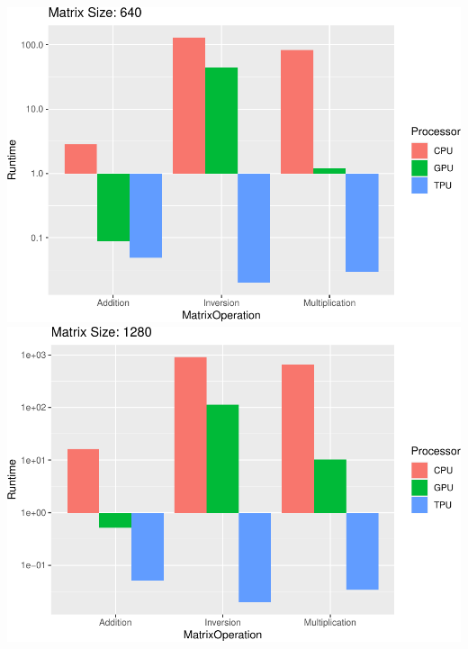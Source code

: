 \documentclass[
]{article}
\begin{document}
\includegraphics{main_files/figure-latex/unnamed-chunk-9-7.pdf}
\includegraphics{main_files/figure-latex/unnamed-chunk-9-8.pdf}
\end{document}
